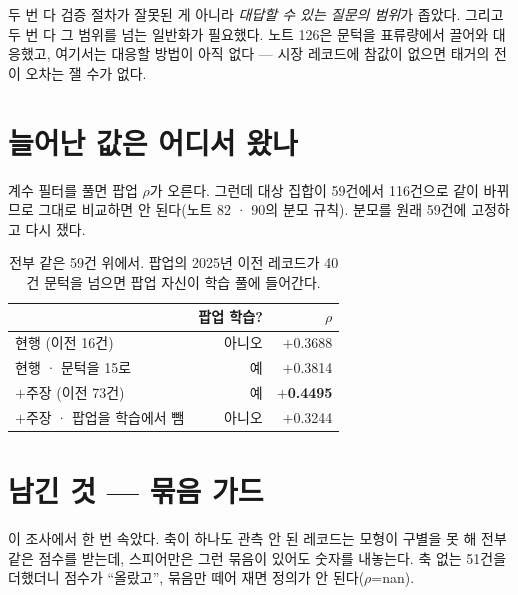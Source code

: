 \documentclass[10pt]{article}
\begin{document}
두 번 다 검증 절차가 잘못된 게 아니라 \emph{대답할 수 있는 질문의 범위}가
좁았다. 그리고 두 번 다 그 범위를 넘는 일반화가 필요했다. 노트 126은
문턱을 표류량에서 끌어와 대응했고, 여기서는 대응할 방법이 아직 없다 ---
시장 레코드에 참값이 없으면 태거의 전이 오차는 잴 수가 없다.


\section{늘어난 값은 어디서 왔나}

계수 필터를 풀면 팝업 $\rho$가 오른다. 그런데 대상 집합이 59건에서 116건으로
같이 바뀌므로 그대로 비교하면 안 된다(노트 82 · 90의 분모 규칙). 분모를
원래 59건에 고정하고 다시 쟀다.

\begin{table}[t]
\centering\tsize
\caption{전부 같은 59건 위에서. 팝업의 2025년 이전 레코드가 40건 문턱을
넘으면 팝업 자신이 학습 풀에 들어간다.}
\begin{tabular}{lrr}
\toprule
& 팝업 학습? & $\rho$ \\
\midrule
현행 (이전 16건) & 아니오 & $+$0.3688 \\
현행 · 문턱을 15로 & 예 & $+$0.3814 \\
$+$주장 (이전 73건) & 예 & \textbf{$+$0.4495} \\
$+$주장 · 팝업을 학습에서 뺌 & 아니오 & $+$0.3244 \\
\bottomrule
\end{tabular}
\end{table}


\section{남긴 것 --- 묶음 가드}

이 조사에서 한 번 속았다. 축이 하나도 관측 안 된 레코드는 모형이 구별을
못 해 전부 같은 점수를 받는데, 스피어만은 그런 묶음이 있어도 숫자를
내놓는다. 축 없는 51건을 더했더니 점수가 ``올랐고'', 묶음만 떼어 재면
정의가 안 된다($\rho$=nan).

\end{document}
